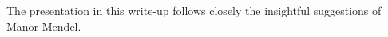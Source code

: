 The presentation in this write-up follows closely the insightful
suggestions of Manor Mendel.

% 
%




\ChapterEnd{}



%
